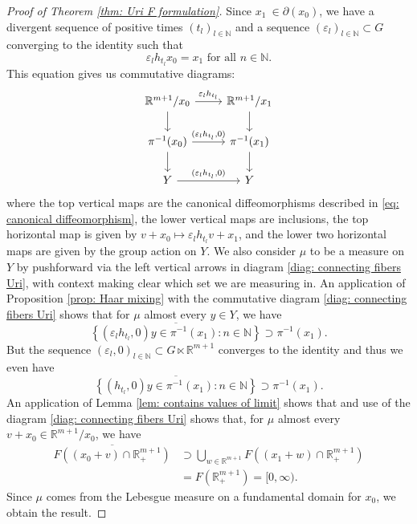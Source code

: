 \documentclass[reqno,11pt, twoside]{amsart}
\theoremstyle{plain}
\theoremstyle{definition}
\theoremstyle{definition}
\theoremstyle{remark}
\numberwithin{equation}{section}
\newcommand{\R}{{\mathbb{R}}}
\newcommand{\N}{{\mathbb{N}}}
\begin{document}
{\begin{proof}[Proof of Theorem \ref{thm: Uri F formulation}]
Since $x_1\ \in \partial(x_0)$, we have a divergent sequence of positive times $(t_l)_{l \in \N}$ and a sequence $(\varepsilon_l)_{l \in \N} \subset G$ converging to the identity such that
\begin{equation*}
    \varepsilon_l h_{t_l} x_0 = x_1 \text{ for all } n \in \N.
\end{equation*}
This equation gives us commutative diagrams:
\begin{equation}\label{diag: connecting fibers Uri}
        \begin{tikzcd}
  \R^{m+1}/x_0   \arrow[r, "\varepsilon_l h_{t_l}"] \arrow[d]  & \R^{m+1}/ x_1   \arrow[d]  \\
  \pi^{-1}(x_0) \arrow[r, "(\varepsilon_l h_{t_l}{,}0)"]  \arrow[d] & \pi^{-1}(x_1)\arrow[d] \\
  Y \arrow[r, "(\varepsilon_l h_{t_l}{,}0)"] & Y
\end{tikzcd}
\end{equation}
where the top vertical maps are the canonical diffeomorphisms described in \eqref{eq: canonical diffeomorphism}, the lower vertical maps are inclusions, the top horizontal map is given by $v + x_0 \mapsto \varepsilon_l h_{t_l}v + x_1$, and the lower  two horizontal  maps are given by the group action on $Y$.
We also consider $\mu$ to be a measure on $Y$ by pushforward via the left vertical arrows in diagram \eqref{diag: connecting fibers Uri}, with context making clear which set we are measuring in. 
An application of Proposition \ref{prop: Haar mixing} with the commutative diagram \ref{diag: connecting fibers Uri} shows that for $\mu$ almost every $y \in Y$, we have 
\begin{equation*}
    \overline{\left\lbrace (\varepsilon_l h_{t_l},0) y \in \pi^{-1}(x_1) : n \in \N\right\rbrace} \supset \pi^{-1}(x_1).
\end{equation*}
But the sequence $(\varepsilon_l,0)_{l \in \N} \subset G\ltimes \R^{m+1}$ converges to the identity and thus we even have
\begin{equation*}
    \overline{\left\lbrace ( h_{t_l},0) y \in \pi^{-1}(x_1) : n \in \N\right\rbrace} \supset \pi^{-1}(x_1).
\end{equation*}
An application of Lemma \ref{lem: contains values of limit} shows that and use of the diagram \ref{diag: connecting fibers Uri} shows that, for $\mu$ almost every  $v + x_0 \in \R^{m+1}/x_0$, we have
\begin{equation*}
\begin{split}
    \overline{F((x_0 + v) \cap \R^{m+1}_+)} &\supset \bigcup_{w \in \R^{m+1}} F((x_1 + w) \cap \R^{m+1}_+) \\
    &= F(\R^{m+1}_+) = [0,\infty).
\end{split}
\end{equation*}
Since $\mu$ comes from the Lebesgue measure on a fundamental domain for $x_0$, we obtain the result.
\end{proof}
}
\end{document}

